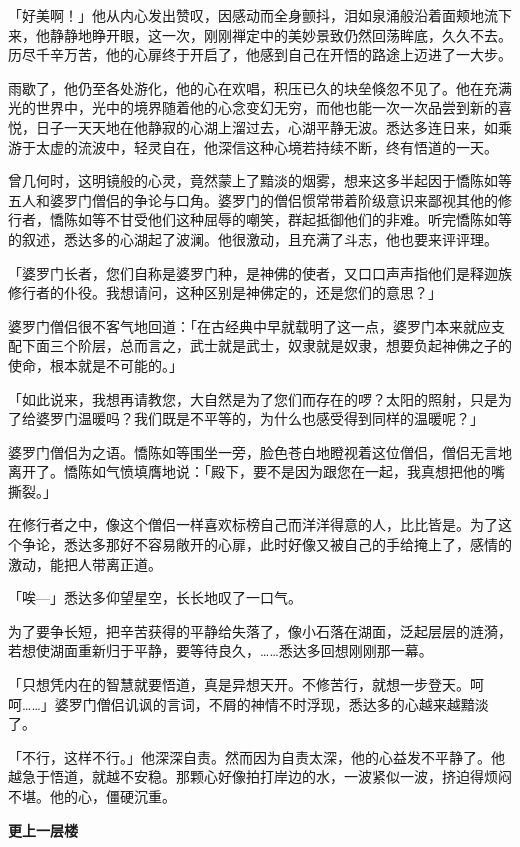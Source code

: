 \documentclass[twoside,openany]{book}
\newcommand{\mt}[1]{\textbullet \textbf{#1}}
\begin{document}
「好美啊！」他从内心发出赞叹，因感动而全身颤抖，泪如泉涌般沿着面颊地流下来，他静静地睁开眼，这一次，刚刚禅定中的美妙景致仍然回荡眸底，久久不去。历尽千辛万苦，他的心扉终于开启了，他感到自己在开悟的路途上迈进了一大步。

雨歇了，他仍至各处游化，他的心在欢唱，积压已久的块垒倏忽不见了。他在充满光的世界中，光中的境界随着他的心念变幻无穷，而他也能一次一次品尝到新的喜悦，日子一天天地在他静寂的心湖上溜过去，心湖平静无波。悉达多连日来，如乘游于太虚的流波中，轻灵自在，他深信这种心境若持续不断，终有悟道的一天。

曾几何时，这明镜般的心灵，竟然蒙上了黯淡的烟雾，想来这多半起因于憍陈如等五人和婆罗门僧侣的争论与口角。婆罗门的僧侣惯常带着阶级意识来鄙视其他的修行者，憍陈如等不甘受他们这种屈辱的嘲笑，群起抵御他们的非难。听完憍陈如等的叙述，悉达多的心湖起了波澜。他很激动，且充满了斗志，他也要来评评理。

「婆罗门长者，您们自称是婆罗门种，是神佛的使者，又口口声声指他们是释迦族修行者的仆役。我想请问，这种区别是神佛定的，还是您们的意思？」

婆罗门僧侣很不客气地回道：「在古经典中早就载明了这一点，婆罗门本来就应支配下面三个阶层，总而言之，武士就是武士，奴隶就是奴隶，想要负起神佛之子的使命，根本就是不可能的。」

「如此说来，我想再请教您，大自然是为了您们而存在的啰？太阳的照射，只是为了给婆罗门温暖吗？我们既是不平等的，为什么也感受得到同样的温暖呢？」

婆罗门僧侣为之语。憍陈如等围坐一旁，脸色苍白地瞪视着这位僧侣，僧侣无言地离开了。憍陈如气愤填膺地说：「殿下，要不是因为跟您在一起，我真想把他的嘴撕裂。」

在修行者之中，像这个僧侣一样喜欢标榜自己而洋洋得意的人，比比皆是。为了这个争论，悉达多那好不容易敞开的心扉，此时好像又被自己的手给掩上了，感情的激动，能把人带离正道。

「唉---」悉达多仰望星空，长长地叹了一口气。

为了要争长短，把辛苦获得的平静给失落了，像小石落在湖面，泛起层层的涟漪，若想使湖面重新归于平静，要等待良久，……悉达多回想刚刚那一幕。

「只想凭内在的智慧就要悟道，真是异想天开。不修苦行，就想一步登天。呵呵……」婆罗门僧侣讥讽的言词，不屑的神情不时浮现，悉达多的心越来越黯淡了。

「不行，这样不行。」他深深自责。然而因为自责太深，他的心益发不平静了。他越急于悟道，就越不安稳。那颗心好像拍打岸边的水，一波紧似一波，挤迫得烦闷不堪。他的心，僵硬沉重。

\mt{更上一层楼}
\end{document}
